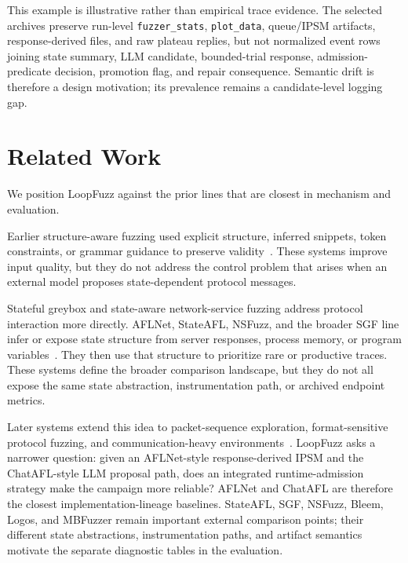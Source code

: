 \documentclass[final,5p,times,number]{elsarticle}
\begin{document}
This example is illustrative rather than empirical trace evidence. The selected archives preserve run-level \texttt{fuzzer\_stats}, \texttt{plot\_data}, queue/IPSM artifacts, response-derived files, and raw plateau replies, but not normalized event rows joining state summary, LLM candidate, bounded-trial response, admission-predicate decision, promotion flag, and repair consequence. Semantic drift is therefore a design motivation; its prevalence remains a candidate-level logging gap.

\section{Related Work}
We position LoopFuzz against the prior lines that are closest in mechanism and evaluation.

Earlier structure-aware fuzzing used explicit structure, inferred snippets, token constraints, or grammar guidance to preserve validity~\cite{snipuzz_black_box_fuzzing_2021,token_level_fuzzing_2021,gramatron_effective_grammar_aware_2021,griffin_grammar_free_dbms_2022,no_grammar_no_problem_2023,likely_invariants_feedback_2021,mundofuzz_grammar_inference_2022}. These systems improve input quality, but they do not address the control problem that arises when an external model proposes state-dependent protocol messages.

Stateful greybox and state-aware network-service fuzzing address protocol interaction more directly. AFLNet, StateAFL, NSFuzz, and the broader SGF line infer or expose state structure from server responses, process memory, or program variables~\cite{aflnet,stateafl,nsfuzz,sgf_usenix22,profuzzbench_benchmark_stateful_protocol_2021}. They then use that structure to prioritize rare or productive traces. These systems define the broader comparison landscape, but they do not all expose the same state abstraction, instrumentation path, or archived endpoint metrics.

Later systems extend this idea to packet-sequence exploration, format-sensitive protocol fuzzing, and communication-heavy environments~\cite{bleem_packet_sequence_2023,formatted_stateful_greybox_fuzzing_2024,logos_log_guided_fuzzing_2024,msgfuzzer_message_sequence_guided_2024,resolverfuzz_query_response_2024,mbfuzzer_mqtt_2025,fuzzusb_hybrid_stateful_fuzzing_2022,dtls_fuzzer_dtls_protocol_2022,edhoc_fuzzer_edhoc_protocol_2023,tron_fuzzing_linux_network_2025}. LoopFuzz asks a narrower question: given an AFLNet-style response-derived IPSM and the ChatAFL-style LLM proposal path, does an integrated runtime-admission strategy make the campaign more reliable? AFLNet and ChatAFL are therefore the closest implementation-lineage baselines. StateAFL, SGF, NSFuzz, Bleem, Logos, and MBFuzzer remain important external comparison points; their different state abstractions, instrumentation paths, and artifact semantics motivate the separate diagnostic tables in the evaluation.
\end{document}
